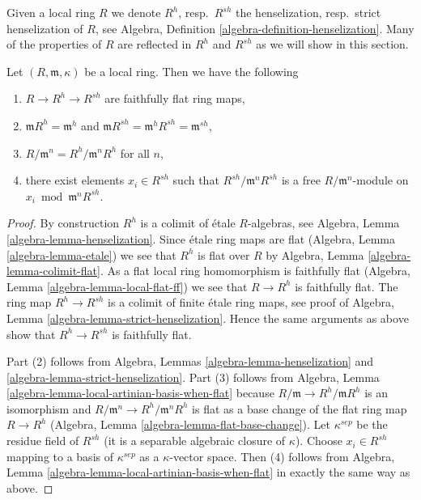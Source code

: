 \noindent
Given a local ring $R$ we denote $R^h$, resp.\ $R^{sh}$ the henselization,
resp.\ strict henselization of $R$, see
Algebra, Definition \ref{algebra-definition-henselization}.
Many of the properties of $R$ are
reflected in $R^h$ and $R^{sh}$ as we will show in this section.

\begin{lemma}
\label{lemma-dumb-properties-henselization}
Let $(R, \mathfrak m, \kappa)$ be a local ring. Then we have the following
\begin{enumerate}
\item $R \to R^h \to R^{sh}$ are faithfully flat ring maps,
\item $\mathfrak m R^h = \mathfrak m^h$ and
$\mathfrak m R^{sh} = \mathfrak m^h R^{sh} = \mathfrak m^{sh}$,
\item $R/\mathfrak m^n = R^h/\mathfrak m^nR^h$ for all $n$,
\item there exist elements $x_i \in R^{sh}$ such that
$R^{sh}/\mathfrak m^nR^{sh}$ is a free $R/\mathfrak m^n$-module
on $x_i \bmod \mathfrak m^nR^{sh}$.
\end{enumerate}
\end{lemma}

\begin{proof}
By construction $R^h$ is a colimit of \'etale $R$-algebras, see
Algebra, Lemma \ref{algebra-lemma-henselization}. Since \'etale
ring maps are flat (Algebra, Lemma \ref{algebra-lemma-etale}) we see that
$R^h$ is flat over $R$ by
Algebra, Lemma \ref{algebra-lemma-colimit-flat}.
As a flat local ring homomorphism is faithfully flat
(Algebra, Lemma \ref{algebra-lemma-local-flat-ff})
we see that $R \to R^h$ is faithfully flat.
The ring map $R^h \to R^{sh}$ is a colimit of finite \'etale ring
maps, see proof of Algebra, Lemma \ref{algebra-lemma-strict-henselization}.
Hence the same arguments as above show that $R^h \to R^{sh}$ is
faithfully flat.

\medskip\noindent
Part (2) follows from Algebra, Lemmas \ref{algebra-lemma-henselization} and
\ref{algebra-lemma-strict-henselization}. Part (3) follows from
Algebra, Lemma \ref{algebra-lemma-local-artinian-basis-when-flat}
because $R/\mathfrak m \to R^h/\mathfrak mR^h$ is an isomorphism and
$R/\mathfrak m^n \to R^h/\mathfrak m^nR^h$ is flat as a base change of
the flat ring map $R \to R^h$
(Algebra, Lemma \ref{algebra-lemma-flat-base-change}).
Let $\kappa^{sep}$ be the residue field of $R^{sh}$ (it is a
separable algebraic closure of $\kappa$). Choose $x_i \in R^{sh}$
mapping to a basis of $\kappa^{sep}$ as a $\kappa$-vector space.
Then (4) follows from
Algebra, Lemma \ref{algebra-lemma-local-artinian-basis-when-flat}
in exactly the same way as above.
\end{proof}

